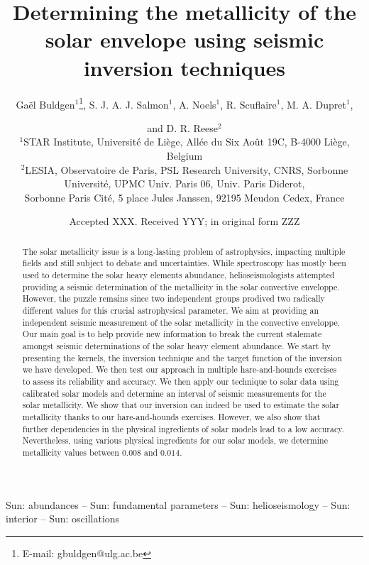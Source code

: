 \documentclass[a4paper,fleqn,usenatbib]{mnras}
\title[Metallicity inversion in the solar envelope]{Determining the metallicity of the solar envelope using seismic inversion techniques}
\author[G. Buldgen et al.]{
Ga\"el Buldgen$^{1}$\thanks{E-mail: gbuldgen@ulg.ac.be},
 S. J. A. J. Salmon$^{1}$,
 A. Noels$^{1}$,
 R. Scuflaire$^{1}$,
 M. A. Dupret$^{1}$, \and and
 D. R. Reese$^{2}$
\\
$^{1}$STAR Institute, Universit\'e de Li\`ege, All\'ee du Six Ao\^ut 19C, B-4000 Li\`ege, Belgium\\
$^{2}$LESIA, Observatoire de Paris, PSL Research University, CNRS, Sorbonne Universit\'e, UPMC Univ. Paris 06, Univ. Paris Diderot,\\ Sorbonne Paris Cit\'e, 5 place Jules Janssen, 92195 Meudon Cedex, France
}
\date{Accepted XXX. Received YYY; in original form ZZZ}
\begin{document}
\label{firstpage}
\pagerange{\pageref{firstpage}--\pageref{lastpage}}
\maketitle

\begin{abstract}
The solar metallicity issue is a long-lasting problem of astrophysics, impacting multiple fields and still subject to debate and uncertainties. While spectroscopy has mostly been used to determine the solar heavy elements abundance, helioseismologists attempted providing a seismic determination of the metallicity in the solar convective enveloppe. However, the puzzle remains since two independent groups prodived two radically different values for this crucial astrophysical parameter. We aim at providing an independent seismic measurement of the solar metallicity in the convective enveloppe. Our main goal is to help provide new information to break the current stalemate amongst seismic determinations of the solar heavy element abundance. We start by presenting the kernels, the inversion technique and the target function of the inversion we have developed. We then test our approach in multiple hare-and-hounds exercises to assess its reliability and accuracy. We then apply our technique to solar data using calibrated solar models and determine an interval of seismic measurements for the solar metallicity. We show that our inversion can indeed be used to estimate the solar metallicity thanks to our hare-and-hounds exercises. However, we also show that further dependencies in the physical ingredients of solar models lead to a low accuracy. Nevertheless, using various physical ingredients for our solar models, we determine metallicity values between $0.008$ and $0.014$.
\end{abstract}

\begin{keywords}
Sun: abundances -- Sun: fundamental parameters -- Sun: helioseismology -- Sun: interior -- Sun: oscillations
\end{keywords}


\end{document}
